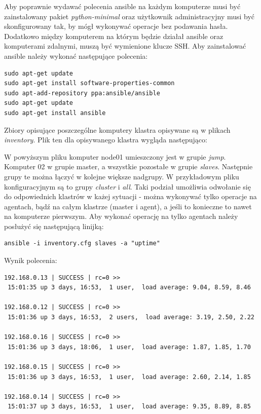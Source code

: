 \documentclass[10pt,a4paper,titlepage,twoside]{report}
\begin{document}
Aby poprawnie wydawać polecenia ansible na każdym komputerze musi być zainstalowany pakiet \textit{python-minimal} oraz użytkownik administracyjny musi być skonfigurowany tak, by mógł wykonywać operacje bez podawania hasła. Dodatkowo między komputerem na którym będzie działał ansible oraz komputerami zdalnymi, muszą być wymienione klucze SSH. Aby zainstalować ansible należy wykonać następujące polecenia:

\begin{lstlisting}
sudo apt-get update
sudo apt-get install software-properties-common
sudo apt-add-repository ppa:ansible/ansible
sudo apt-get update
sudo apt-get install ansible
\end{lstlisting}

Zbiory opisujące poszczególne komputery klastra opisywane są w plikach \textit{inventory}. Plik ten dla opisywanego klastra wygląda następująco:


W powyższym pliku komputer node01 umieszczony jest w grupie \textit{jump}. Komputer 02 w grupie master, a wszystkie pozostałe w grupie \textit{slaves}. Następnie grupy te można łączyć w kolejne większe nadgrupy. W przykładowym pliku konfiguracyjnym są to grupy \textit{cluster} i \textit{all}. Taki podział umożliwia odwołanie się do odpowiednich klastrów w każej sytuacji - można wykonywać tylko operacje na agentach, bądź na całym klastrze (master i agent), a jeśli to konieczne to nawet na komputerze pierwszym. Aby wykonać operację na tylko agentach należy posłużyć się następującą linijką:

\begin{lstlisting}
ansible -i inventory.cfg slaves -a "uptime"
\end{lstlisting}

Wynik polecenia:

\begin{lstlisting}
192.168.0.13 | SUCCESS | rc=0 >>                                                                                                                      
 15:01:35 up 3 days, 16:53,  1 user,  load average: 9.04, 8.59, 8.46
 
192.168.0.12 | SUCCESS | rc=0 >>                                                                                                                      
 15:01:36 up 3 days, 16:53,  2 users,  load average: 3.19, 2.50, 2.22
 
192.168.0.16 | SUCCESS | rc=0 >>                                                                                                                      
 15:01:36 up 3 days, 18:06,  1 user,  load average: 1.87, 1.85, 1.70
 
192.168.0.15 | SUCCESS | rc=0 >>                                                                                                                      
 15:01:36 up 3 days, 16:53,  1 user,  load average: 2.60, 2.14, 1.85
 
192.168.0.14 | SUCCESS | rc=0 >>                                                                                                                      
 15:01:37 up 3 days, 16:53,  1 user,  load average: 9.35, 8.89, 8.85
\end{lstlisting}
\end{document}
